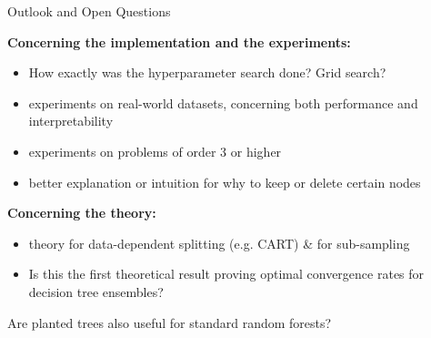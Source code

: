 \documentclass{beamer}
\begin{document}
\begin{frame}{Outlook and Open Questions}
    
    \textbf{Concerning the implementation and the experiments:}
    \begin{itemize}
        \item How exactly was the hyperparameter search done? Grid search?
        \item experiments on real-world datasets, concerning both performance and interpretability
        \item experiments on problems of order 3 or higher
        \item better explanation or intuition for why to keep or delete certain nodes
    \end{itemize}

    \textbf{Concerning the theory:}
    \begin{itemize}
        \item theory for data-dependent splitting (e.g. CART) \& for sub-sampling
        \item Is this the first theoretical result proving optimal convergence rates for decision tree ensembles?
    \end{itemize}

    Are planted trees also useful for standard random forests?
    
\vspace{1cm}

\end{frame}
\end{document}
